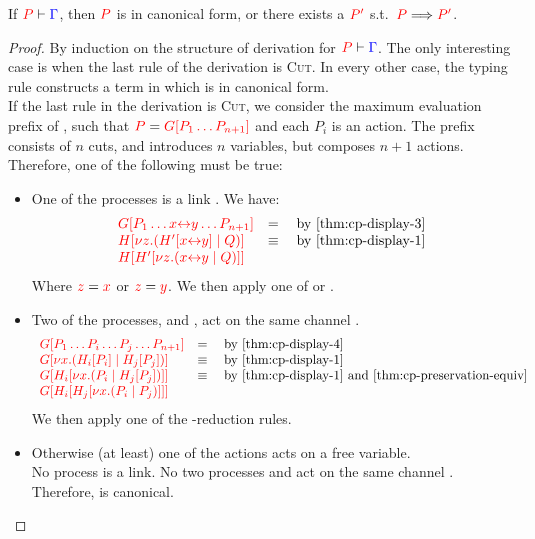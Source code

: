 \begin{theorem}[Progress]\label{thm:cp-progress}
  If $\seq[{ P }]{ \Gamma }$, then $\tm{P}$ is in canonical form, or there
  exists a $\tm{P'}$ s.t.\ $\reducesto{P}{P'}$. 
\end{theorem}
\begin{proof}
  By induction on the structure of derivation for $\seq[{ P }]{ \Gamma }$.
  The only interesting case is when the last rule of the derivation is
  \textsc{Cut}. In every other case, the typing rule constructs a term in which
  is in canonical form. 
  \\
  If the last rule in the derivation is \textsc{Cut}, we consider the maximum
  evaluation prefix  of , such that $\tm{P} = \tm{\cpPlug{G}{P_1
      \dots P_{n+1}}}$ and each $P_i$ is an action.
  The prefix  consists of $n$ cuts, and introduces $n$ variables, but
  composes $n+1$ actions. Therefore, one of the following must be true:
  \begin{itemize}
  \item
    One of the processes is a link .
    We have:
    \begin{gather*}
      \begin{array}{ll}
        \tm{\cpPlug{G}{P_1 \dots \cpLink{x}{y} \dots P_{n+1}}}
        & = \quad \text{by \cref{thm:cp-display-3}}
        \\
        \tm{\cpPlug{H}{\cpCut{z}{\cpPlug{H'}{\cpLink{x}{y}}}{Q}}}
        & \equiv \quad \text{by \cref{thm:cp-display-1}}
        \\
        \tm{\cpPlug{H}{\cpPlug{H'}{\cpCut{z}{\cpLink{x}{y}}{Q}}}}
      \end{array}
    \end{gather*}
    Where $\tm{z} = \tm{x}$ or $\tm{z} = \tm{y}$.
    We then apply one of  or .
  \item
    Two of the processes,  and , act on the same channel .
    \begin{gather*}
      \begin{array}{ll}
        \tm{\cpPlug{G}{P_1 \dots P_i \dots P_j \dots P_{n+1}}}
        & = \quad \text{by \cref{thm:cp-display-4}}
        \\
        \tm{\cpPlug{G}{\cpCut{x}{\cpPlug{H_i}{P_i}}{\cpPlug{H_j}{P_j}}}}
        & \equiv \quad \text{by \cref{thm:cp-display-1}} 
        \\
        \tm{\cpPlug{G}{\cpPlug{H_i}{\cpCut{x}{P_i}{\cpPlug{H_j}{P_j}}}}}
        & \equiv \quad \text{by \cref{thm:cp-display-1} and
          \cref{thm:cp-preservation-equiv}} 
        \\
        \tm{\cpPlug{G}{\cpPlug{H_i}{\cpPlug{H_j}{\cpCut{x}{P_i}{P_j}}}}} 
      \end{array}
    \end{gather*}
    We then apply one of the \textbeta-reduction rules.
  \item
    Otherwise (at least) one of the actions acts on a free variable.
    \\
    No process  is a link.
    No two processes  and  act on the same channel .
    Therefore,  is canonical.
  \end{itemize}
\end{proof}
